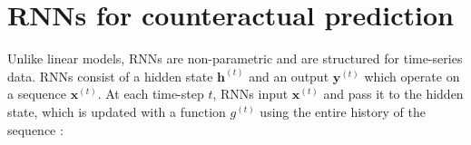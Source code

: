 \documentclass[hidelinks,12pt]{article}
\begin{document}
	
	
	


\section{RNNs for counteractual prediction} \label{RNNs-section}

Unlike linear models, RNNs are non-parametric and are structured for time-series data. RNNs consist of a hidden state $\mathbf{h}^{(t)}$ and an output $\mathbf{y}^{(t)}$ which operate on a sequence $\mathbf{x}^{(t)}$. At each time-step $t$, RNNs input $\mathbf{x}^{(t)}$ and pass it to the hidden state, which is updated with a function $g^{(t)}$ using the entire history of the sequence \citep[pp. 337][]{goodfellow2016deep}:
\end{document}
